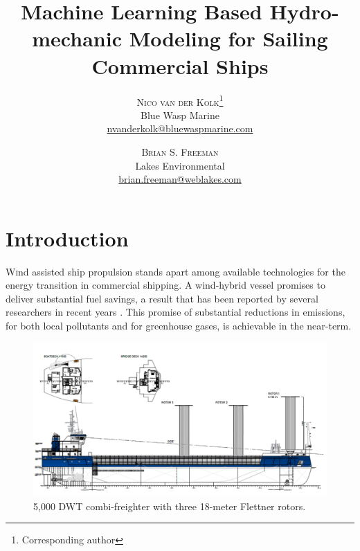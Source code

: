 \documentclass[twoside,twocolumn]{article}
\title{Machine Learning Based Hydro-mechanic Modeling for Sailing Commercial Ships} %
\author{%
\textsc{Nico van der Kolk}\thanks{Corresponding author} \\[1ex] %
\normalsize Blue Wasp Marine \\ %
\normalsize \href{mailto:nvanderkolk@bluewaspmarine.com}{nvanderkolk@bluewaspmarine.com} %
\and %
\textsc{Brian S. Freeman} \\[1ex] %
\normalsize Lakes Environmental \\ %
\normalsize \href{brian.freeman@weblakes.com}{brian.freeman@weblakes.com } %
}
\date{} %
\begin{document}





\maketitle


\printnomenclature

\section{Introduction}

\lettrine[nindent=0em,lines=3]{W}ind assisted ship propulsion stands apart among available technologies for the energy transition in commercial shipping. A wind-hybrid vessel promises to deliver substantial fuel savings, a result that has been reported by several researchers in recent years \cite{Fujiwara05a, Naaijen10, Traut14, Eggers16}. This promise of substantial reductions in emissions, for both local pollutants and for greenhouse gases, is achievable in the near-term.

\begin{figure}[!ht]
	\centering
	\includegraphics[width=\textwidth]{images/CF5000_318.png}  %
	\caption{5,000 DWT combi-freighter with three 18-meter Flettner rotors.}
	\label{fig:Baltic318}
\end{figure}
\end{document}
